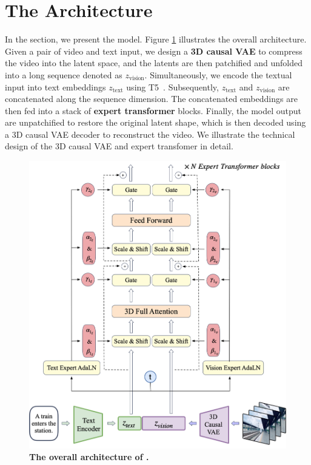 \section{The \model Architecture}\label{sec:model}


In the section, we present the \model model. 
Figure \ref{fig:model} illustrates the overall architecture. 
Given a pair of video and text input,  we design a \textbf{3D causal VAE} to compress the video into the latent space, and the latents are then patchified and unfolded into a long sequence denoted as $z_{\text{vision}}$. 
Simultaneously, we encode the textual input into text embeddings $z_{\text{text}}$ using T5~\citep{raffel2020exploring}. 
Subsequently, $z_{\text{text}}$ and $z_{\text{vision}}$ are concatenated along the sequence dimension. 
The concatenated embeddings are then fed into a stack of \textbf{expert transformer} blocks.
Finally, the model output are unpatchified to restore the original latent shape, which is then decoded using a 3D causal VAE decoder to reconstruct the video. 
We illustrate the technical design of the 3D causal VAE and expert transfomer in detail.

\begin{figure}[h]
\begin{center}
\includegraphics[width=0.6\linewidth]{images/transformer.png}
\end{center}
\caption{\textbf{The overall architecture of \model.} }
\label{fig:model}
\end{figure}



